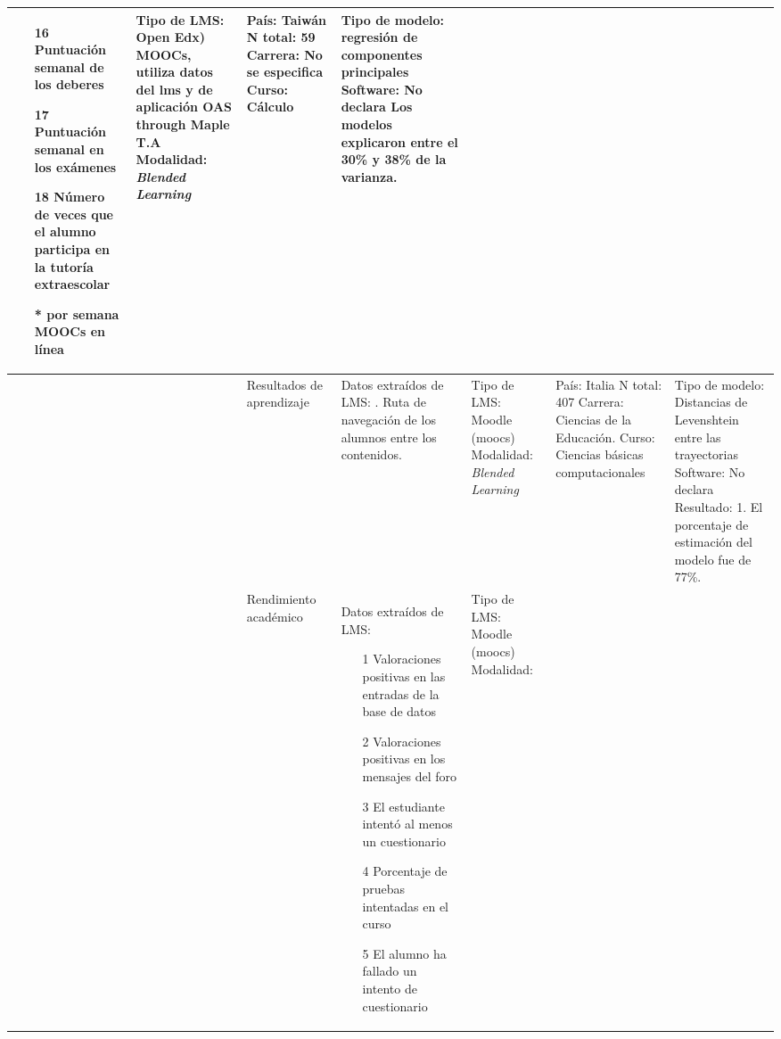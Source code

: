 \documentclass[spanish]{textolivre}
\begin{document}
\begin{small}
\begin{longtable}{
    >{\raggedright\arraybackslash}p{}
    p{}
    p{}
    p{}
    p{}
    p{}
    p{}
    }
\begin{itemize}
\item[16] Puntuación semanal de los deberes
\item[17] Puntuación semanal en los exámenes
\item[18] Número de veces que el alumno participa en la tutoría extraescolar
\item[*] por semana MOOCs en línea
\end{itemize} & Tipo de LMS: Open Edx) MOOCs, utiliza datos del lms y de aplicación OAS through Maple T.A \newline Modalidad:
\emph{Blended Learning} & País: Taiwán \newline N total: 59 \newline Carrera: No se especifica \newline Curso: Cálculo & Tipo de modelo: regresión de componentes principales \newline Software: No declara \newline Los modelos explicaron entre el 30\% y 38\% de la varianza.
\\
\midrule
4 & \cite{miranda2019} &  Resultados de aprendizaje & Datos extraídos de LMS: \newline 1. Ruta de navegación de los alumnos entre los contenidos. & Tipo de LMS: Moodle (moocs) \newline Modalidad: \emph{Blended Learning} & País: Italia \newline N total: 407 \newline Carrera: Ciencias de la Educación. \newline Curso: Ciencias básicas computacionales & Tipo de modelo: Distancias de Levenshtein entre las trayectorias \newline Software: No declara \newline 
Resultado:
1.	El porcentaje de estimación del modelo fue de 77\%.
\\
\midrule
5 & \cite{monllao_olive2020} & Rendimiento académico & Datos extraídos de LMS:
\begin{itemize}
\item[1] Valoraciones positivas en las entradas de la base de datos
\item[2] Valoraciones positivas en los mensajes del foro
\item[3] El estudiante intentó al menos un cuestionario
\item[4] Porcentaje de pruebas intentadas en el curso
\item[5] El alumno ha fallado un intento de cuestionario
\end{itemize} & Tipo de LMS: Moodle (moocs) \newline Modalidad:

\end{longtable}
\end{small}
\end{document}
